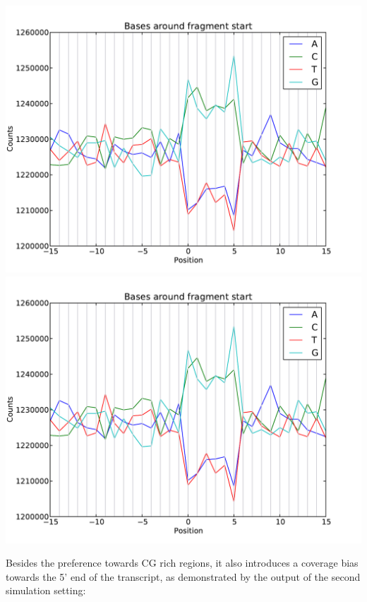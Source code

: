 \begin{center}
\includegraphics[scale=0.6,page=1]{../src/test/pos_bias/pb_prim_jump.pdf}
\\
\includegraphics[scale=0.6,page=2]{../src/test/pos_bias/pb_prim_jump.pdf}
\end{center}

Besides the preference towards CG rich regions, it also introduces a coverage bias towards the 5' end of the transcript,
as demonstrated by the output of the second simulation setting:

